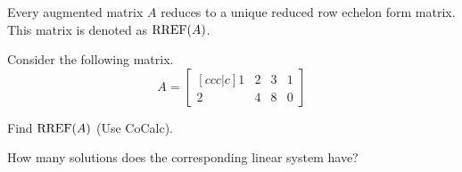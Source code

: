 


\newcommand{\drawtruss}[1][1]{%
\begin{center}
\begin{tikzpicture}[scale=#1]
\draw (0,0) -- node[left,magenta]{$1$} (1,1.71) -- node[right,magenta]{$3$} (2,0) -- node[above,magenta]{$2$} cycle;
\draw (2,0) -- node[left,magenta]{$5$} (3,1.71) -- node[above,magenta]{$4$} (1,1.71) -- cycle;
\draw (3,1.71) -- node[right,magenta]{$7$}  (4,0) -- node[above,magenta]{$6$} (2,0) -- cycle;
\draw[blue] (0,0) -- (0.25,-0.425) -- (-0.25,-0.425) -- cycle;
\draw[blue] (4,0) -- (4.25,-0.425) -- (3.75,-0.425) -- cycle;
\draw[thick,red,->] (2,0) --node[right]{10000 N} (2,-0.75);
\end{tikzpicture}
\end{center}
}


\begin{applicationActivities}{2}{4}

\begin{fact}
  Every augmented matrix \(A\) reduces to a unique reduced row echelon form
  matrix. This matrix is denoted as \(\operatorname{RREF}(A)\).
\end{fact}

\begin{activity}{10}
  Consider the following matrix.
  \[
    A = \begin{bmatrix}[ccc|c]
      1 & 2 & 3 & 1\\
      2 & 4 & 8 & 0
    \end{bmatrix}
  \]
  \begin{subactivity}
    Find \(\operatorname{RREF}(A)\) (Use CoCalc).
  \end{subactivity}
  \begin{subactivity}
    How many solutions does the corresponding linear system have?
  \end{subactivity}
\end{activity}


\end{applicationActivities}
